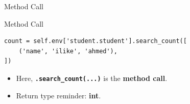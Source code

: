 \begin{frame}[fragile]{Method Call}
\begin{block}{Method Call}
\begin{lstlisting}
count = self.env['student.student'].search_count([
	('name', 'ilike', 'ahmed'),
])
\end{lstlisting}
	\begin{itemize}
		\item Here, \textbf{\texttt{.search\_count(...)}} is the \textbf{method call}.
		\item Return type reminder: \textbf{int}.
	\end{itemize}
\end{block}
\end{frame}
